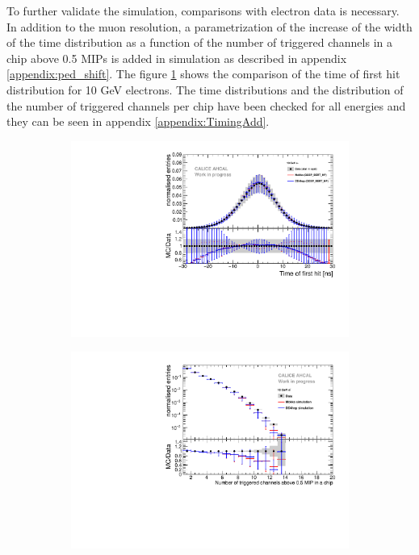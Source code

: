 To further validate the simulation, comparisons with electron data is necessary. In addition to the muon resolution, a parametrization of the increase of the width of the time distribution as a function of the number of triggered channels in a chip above 0.5 MIPs is added in simulation as described in appendix \ref{appendix:ped_shift}. The figure \ref{fig:elec_sim_data_10GeV} shows the comparison of the time of first hit distribution for 10 GeV electrons. The time distributions and the distribution of the number of triggered channels per chip have been checked for all energies and they can be seen in appendix \ref{appendix:TimingAdd}.

\begin{figure}[htbp!]
	\centering
	\begin{subfigure}[t]{0.49\textwidth}
		\includegraphics[width=1\textwidth]{../Thesis_Plots/Timing/Electrons/Plots/Comparison_SimData_Electrons10GeV.pdf}
		\caption{}\label{fig:elec_sim_data_10GeV}
	\end{subfigure}
	\hfill
	\begin{subfigure}[t]{0.49\textwidth}
		\includegraphics[width=1\textwidth]{../Thesis_Plots/Timing/Electrons/Plots/Comparison_SimData_Electrons_nHits_10GeV.pdf}

\end{subfigure}
\end{figure}
